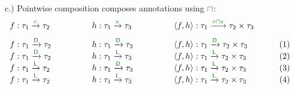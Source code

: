 \begin{figure}
\vspace{0.5em}
c.) Pointwise composition composes annotations using $\cclrd{\sqcap}$:
\begin{equation*}
\begin{array}{llll}
f : \tau_1 \xrightarrow{\cclrd{r}} \tau_2 \qquad\qquad&
h : \tau_1 \xrightarrow{\cclrd{s}} \tau_3 \qquad\qquad&
\langle f, h \rangle : \tau_1 \xrightarrow{\cclrd{r} \cclrd{\sqcap} \cclrd{s}} \tau_2 \times \tau_3 \qquad&~
\\[0.75em]
f : \tau_1 \xrightarrow{\cclrd{ \cclrd{\ident{D}} }} \tau_2 &
h : \tau_1 \xrightarrow{\cclrd{ \cclrd{\ident{D}} }} \tau_3 &
\langle f, h \rangle : \tau_1 \xrightarrow{\cclrd{ \cclrd{\ident{D}} }} \tau_2 \times \tau_3 & (1)
\\[-0.10em]
f : \tau_1 \xrightarrow{\cclrd{ \cclrd{\ident{D}} }} \tau_2 &
h : \tau_1 \xrightarrow{\cclrd{ \cclrd{\ident{L}} }} \tau_3 &
\langle f, h \rangle : \tau_1 \xrightarrow{\cclrd{ \cclrd{\ident{L}} }} \tau_2 \times \tau_3 & (2)
\\[-0.10em]
f : \tau_1 \xrightarrow{\cclrd{ \cclrd{\ident{L}} }} \tau_2 &
h : \tau_1 \xrightarrow{\cclrd{ \cclrd{\ident{D}} }} \tau_3 &
\langle f, h \rangle : \tau_1 \xrightarrow{\cclrd{ \cclrd{\ident{L}} }} \tau_2 \times \tau_3 & (3)
\\[-0.10em]
f : \tau_1 \xrightarrow{\cclrd{ \cclrd{\ident{L}} }} \tau_2 &
h : \tau_1 \xrightarrow{\cclrd{ \cclrd{\ident{L}} }} \tau_3 &
\langle f, h \rangle : \tau_1 \xrightarrow{\cclrd{ \cclrd{\ident{L}} }} \tau_2 \times \tau_3 & (4)
\end{array}
\end{equation*}

\label{fig:applications-flat-livealg}
\end{figure}


